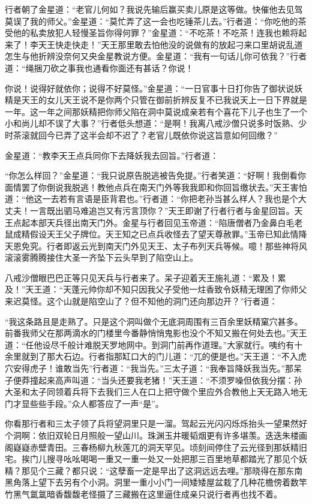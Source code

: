 \documentclass[12pt,UTF8]{ctexbook}
\begin{document}
{	行者朝了金星道：“老官儿何如？我说先输后赢买卖儿原是这等做。快催他去见驾莫误了我的师父。”金星道：“莫忙弄了这一会也吃锤茶儿去。”行者道：“你吃他的茶受他的私卖放犯人轻慢圣旨你得何罪？”金星道：“不吃茶！不吃茶！连我也赖将起来了！李天王快走快走！”天王那里敢去怕他没的说做有的放起刁来口里胡说乱道怎生与他折辨没奈何又央金星教说方便。金星道：“我有一句话儿你可依我？”行者道：“绳捆刀砍之事我也通看你面还有甚话？你说！
	
	你说！说得好就依你；说得不好莫怪。”金星道：“一日官事十日打你告了御状说妖精是天王的女儿天王说不是你两个只管在御前折辨反复不已我说天上一日下界就是一年。这一年之间那妖精把你师父陷在洞中莫说成亲若有个喜花下儿子也生了一个小和尚儿却不误了大事？”行者低头想道：“是啊！我离八戒沙僧只说多时饭熟、少时茶滚就回今已弄了这半会却不迟了？老官儿既依你说这旨意如何回缴？”
	
	金星道：“教李天王点兵同你下去降妖我去回旨。”行者道：
	
	“你怎么样回？”金星道：“我只说原告脱逃被告免提。”行者笑道：“好啊！我倒看你面情罢了你倒说我脱逃！教他点兵在南天门外等我我即和你回旨缴状去。”天王害怕道：“他这一去若有言语是臣背君也。”行者道：“你把老孙当甚么样人？我也是个大丈夫！一言既出驷马难追岂又有污言顶你？”天王即谢了行者行者与金星回旨。天王点起本部天兵径出南天门外。金星与行者回见玉帝道：“陷唐僧者乃金鼻白毛老鼠成精假设天王父子牌位。天王知之已点兵收怪去了望天尊赦罪。”玉帝已知此情降天恩免究。行者即返云光到南天门外见天王、太子布列天兵等候。噫！那些神将风滚滚雾腾腾接住大圣一齐坠下云头早到了陷空山上。
	
	八戒沙僧眼巴巴正等只见天兵与行者来了。呆子迎着天王施礼道：“累及！累及！”天王道：“天蓬元帅你却不知只因我父子受他一炷香致令妖精无理困了你师父来迟莫怪。这个山就是陷空山了？但不知他的洞门还向那边开？”行者道：
	
	“我这条路且是走熟了。只是这个洞叫做个无底洞周围有三百余里妖精窠穴甚多。前番我师父在那两滴水的门楼里今番静悄悄鬼影也没个不知又搬在何处去也。”天王道：“任他设尽千般计难脱天罗地网中。到洞门前再作道理。”大家就行。咦约有十余里就到了那大石边。行者指那缸口大的门儿道：“兀的便是也。”天王道：“不入虎穴安得虎子！谁敢当先”行者道：“我当先。”三太子道：“我奉旨降妖我当先。”那呆子便莽撞起来高声叫道：“当头还要我老猪！”天王道：“不须罗噪但依我分摆：孙大圣和太子同领着兵将下去我们三人在口上把守做个里应外合教他上天无路入地无门才显些些手段。”众人都答应了一声“是”。
	
	你看那行者和三太子领了兵将望洞里只是一溜。驾起云光闪闪烁烁抬头一望果然好个洞啊：依旧双轮日月照般一望山川。珠渊玉井暖韬烟更有许多堪羡。迭迭朱楼画阁嶷嶷赤壁青田。三春杨柳九秋莲兀的洞天罕见。顷刻间停住了云光径到那妖精旧宅。挨门儿搜寻吆吆喝喝一重又一重一处又一处把那三百里地草都踏光了那见个妖精？那见个三藏？都只说：“这孽畜一定是早出了这洞远远去哩。”那晓得在那东南黑角落上望下去另有个小洞。洞里一重小小门一间矮矮屋盆栽了几种花檐傍着数竿竹黑气氲氲暗香馥馥老怪摄了三藏搬在这里逼住成亲只说行者再也找不着。
	
}
\end{document}
